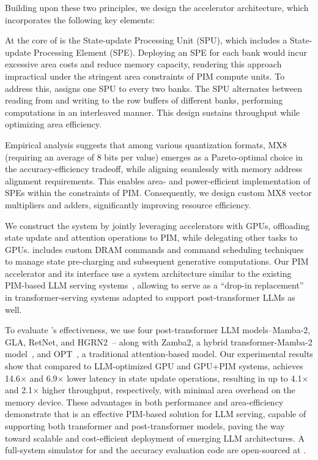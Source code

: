 %
\noindent Building upon these two principles, we design the \sysname{}
accelerator architecture, which incorporates the following key elements:
%

%
%
At the core of \sysname{} is the State-update Processing Unit (SPU),
which includes a State-update Processing Element (SPE).
%
Deploying an SPE for each bank would incur excessive area costs and
reduce memory capacity, rendering this approach impractical under the
stringent area constraints of PIM compute units.
%
To address this, \sysname{} assigns one SPU to every two banks.
%
The SPU alternates between reading from and writing to the row
buffers of different banks, performing computations in an interleaved manner.
%
This design sustains throughput while optimizing area efficiency.
%

%
%
Empirical analysis suggests that among various quantization formats,
MX8~\cite{rouhani2023shared} (requiring an average of 8 bits per
value) emerges as a Pareto-optimal choice in the accuracy-efficiency
tradeoff, while aligning seamlessly with memory address alignment requirements.
%
This enables area- and power-efficient implementation of SPEs within
the constraints of PIM.
%
Consequently, we design custom MX8 vector multipliers and adders,
significantly improving resource efficiency.
%

%
%
We construct the \sysname{} system by jointly leveraging \sysname{}
accelerators with GPUs, offloading state update and attention
operations to PIM, while delegating other tasks to GPUs.
%
\sysname{} includes custom DRAM commands and command scheduling
techniques to manage state pre-charging and subsequent generative computations.
%
Our PIM accelerator and its interface use a system architecture
similar to the existing PIM-based LLM serving
systems~\cite{heo2024neupims, park2024attacc, ianus, cxl-pnm},
allowing \sysname{} to serve as a ``drop-in replacement'' in
transformer-serving systems adapted to support post-transformer LLMs as well.
%

%
To evaluate \sysname{}'s effectiveness, we use four post-transformer
LLM models--Mamba-2, GLA, RetNet, and HGRN2~\cite{mamba2,
gated_linear_attention, retnet, hgrn2}-- along with Zamba2, a hybrid
transformer-Mamba-2 model~\cite{zamba2}, and OPT~\cite{zhang2022opt},
a traditional attention-based model.
%
Our experimental results show that compared to LLM-optimized GPU and
GPU+PIM systems, \sysname{} achieves 14.6$\times$ and 6.9$\times$
lower latency in state update operations, resulting in up to
4.1$\times$ and 2.1$\times$ higher throughput, respectively, with
minimal area overhead on the memory device.
%
These advantages in both performance and area-efficiency demonstrate
that \sysname{} is an effective PIM-based solution for LLM serving,
capable of supporting both transformer and post-transformer models,
paving the way toward scalable and cost-efficient deployment of
emerging LLM architectures.
%
A full-system simulator for \sysname{} and the accuracy evaluation code
are open-sourced at .
%
